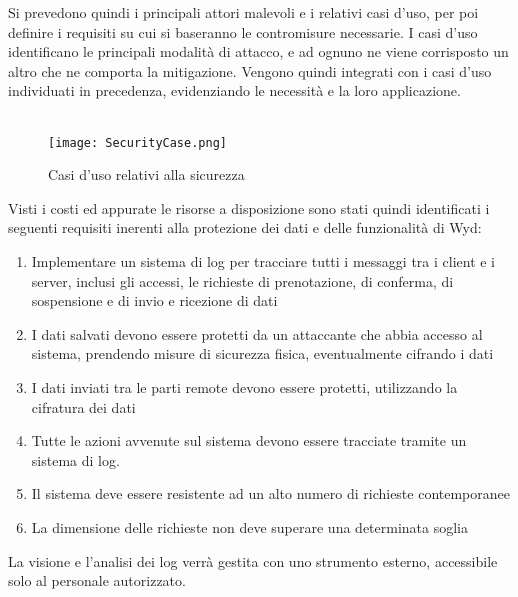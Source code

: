 \clearpage
Si prevedono quindi i principali attori malevoli e i relativi casi d'uso,
per poi definire i requisiti su cui si baseranno le contromisure necessarie.
I casi d'uso identificano le principali modalità di attacco,
e ad ognuno ne viene corrisposto un altro che ne comporta la mitigazione.
Vengono quindi integrati con i casi d'uso individuati in precedenza,
evidenziando le necessità e la loro applicazione.\\
\\
\begin{figure}[h!]
    \begin{center}
        \texttt{[image: SecurityCase.png]}
        \caption{Casi d'uso relativi alla sicurezza}
    \end{center}

\end{figure}
\clearpage

Visti i costi ed appurate le risorse a disposizione sono stati quindi identificati i seguenti requisiti
inerenti alla protezione dei dati e delle funzionalità di Wyd:
\begin{enumerate}
    \item Implementare un sistema di log per tracciare tutti i messaggi tra i client e i server, inclusi gli accessi, le richieste di prenotazione, di conferma, di sospensione e di invio e ricezione di dati
    \item I dati salvati devono essere protetti da un attaccante che abbia accesso al sistema, prendendo misure di sicurezza fisica, eventualmente cifrando i dati
    \item I dati inviati tra le parti remote devono essere protetti, utilizzando la cifratura dei dati
    \item Tutte le azioni avvenute sul sistema devono essere tracciate tramite un sistema di log.
    \item Il sistema deve essere resistente ad un alto numero di richieste contemporanee
    \item La dimensione delle richieste non deve superare una determinata soglia
\end{enumerate}

La visione e l'analisi dei log verrà gestita con uno strumento esterno, accessibile solo al personale autorizzato.


